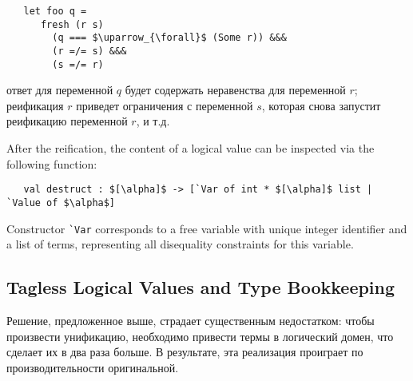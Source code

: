 
\begin{lstlisting}
   let foo q =
      fresh (r s)
        (q === $\uparrow_{\forall}$ (Some r)) &&&
        (r =/= s) &&&
        (s =/= r)
\end{lstlisting}

\noindent ответ для переменной  $q$ будет содержать неравенства для переменной $r$; реификация $r$ приведет ограничения с переменной $s$, которая снова запустит реификацию переменной $r$, и т.д.


After the reification, the content of a logical value can be inspected via the following function:

\begin{lstlisting}
   val destruct : $[\alpha]$ -> [`Var of int * $[\alpha]$ list | `Value of $\alpha$]
\end{lstlisting}

Constructor \lstinline|`Var| corresponds to a free variable with unique integer identifier and a list of terms,
representing all disequality constraints for this variable.

\subsection{Tagless Logical Values and Type Bookkeeping}

Решение, предложенное выше, страдает существенным недостатком: чтобы произвести унификацию, необходимо привести термы в логический домен, что сделает их в два раза больше. В результате, эта реализация проиграет по производительности оригинальной.



